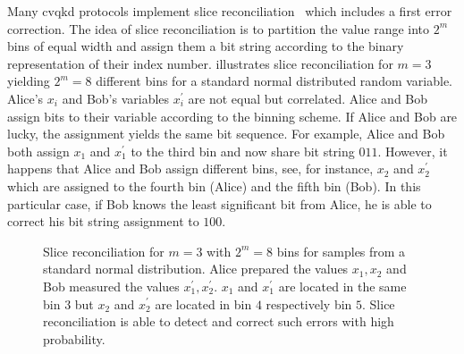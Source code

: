 Many \gls{cvqkd} protocols implement slice reconciliation~\cite{Grosshans2002} which includes a first error correction.
The idea of slice reconciliation is to partition the value range into $2^m$ bins of equal width and assign them a bit string according to the binary representation of their index number.
 illustrates slice reconciliation for $m=3$ yielding $2^m=8$ different bins for a standard normal distributed random variable.
Alice's $x_i$ and Bob's variables $x_i^\prime$ are not equal but correlated.
Alice and Bob assign bits to their variable according to the binning scheme.
If Alice and Bob are lucky, the assignment yields the same bit sequence.
For example, Alice and Bob both assign $x_1$ and $x_1^\prime$ to the third bin and now share bit string $011$.
However, it happens that Alice and Bob assign different bins, see, for instance, $x_2$ and $x_2^\prime$ which are assigned to the fourth bin (Alice) and the fifth bin (Bob).
In this particular case, if Bob knows the least significant bit from Alice, he is able to correct his bit string assignment to $100$.
\begin{figure}[htb]
	\centering
	
	\caption{Slice reconciliation for $m=3$ with $2^m=8$ bins for samples from a standard normal distribution. Alice prepared the values $x_1,x_2$ and Bob measured the values $x_1^\prime,x_2^\prime$. $x_1$ and $x_1^\prime$ are located in the same bin $3$ but $x_2$ and $x_2^\prime$ are located in bin $4$ respectively bin $5$. Slice reconciliation is able to detect and correct such errors with high probability.}\label{fig:slice_reconciliation}
\end{figure}

